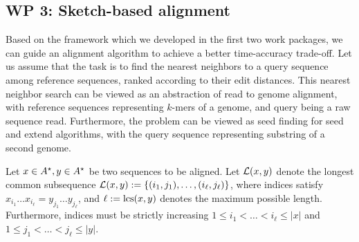 \subsection{WP 3: Sketch-based alignment}
Based on the framework which we developed in the first two work packages, we can guide an alignment algorithm to achieve a better time-accuracy trade-off. Let us assume that the task is to find the nearest neighbors to a query sequence among reference sequences, ranked according to their edit distances. This nearest neighbor search can be viewed as an abstraction of read to genome alignment, with reference sequences representing $k$-mers of a genome, and query being a raw sequence read. Furthermore, the problem can be viewed as seed finding for seed and extend algorithms, with the query sequence representing substring of a second genome. 


Let $x \in A^\star, y\in A^\star$ be two sequences to be aligned. Let $\mathcal{L}(x,y)$ denote the longest common subsequence $\mathcal{L}(x,y):= \left\{(i_1,j_1),\dots,(i_\ell,j_\ell)\right\}$, where indices satisfy $x_{i_1}\dots x_{i_\ell} =y_{j_1}\dots y_{j_\ell}$, and $\ell:=\operatorname{\mathrm{lcs}}(x,y)$ denotes the maximum possible length. Furthermore, indices must be strictly increasing $1\le i_1<\dots<i_\ell\le |x|$ and $1\le j_1<\dots<j_\ell\le |y|$. 

